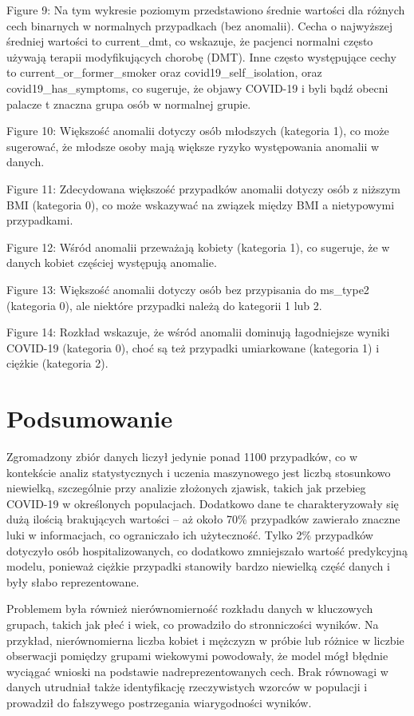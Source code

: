 \documentclass[a4paper,fleqn]{cas-dc}
\begin{document}
Figure 9: Na tym wykresie poziomym przedstawiono średnie wartości dla różnych cech binarnych w normalnych przypadkach (bez anomalii). Cecha o najwyższej średniej wartości to current\_dmt, co wskazuje, że pacjenci normalni często używają terapii modyfikujących chorobę (DMT). Inne często występujące cechy to current\_or\_former\_smoker oraz covid19\_self\_isolation, oraz covid19\_has\_symptoms, co sugeruje, że objawy COVID-19 i byli bądź obecni palacze t znaczna grupa osób w normalnej grupie.

Figure 10: Większość anomalii dotyczy osób młodszych (kategoria 1), co może sugerować, że młodsze osoby mają większe ryzyko występowania anomalii w danych.

Figure 11: Zdecydowana większość przypadków anomalii dotyczy osób z niższym BMI (kategoria 0), co może wskazywać na związek między BMI a nietypowymi przypadkami.

Figure 12: Wśród anomalii przeważają kobiety (kategoria 1), co sugeruje, że w danych kobiet częściej występują anomalie.

Figure 13: Większość anomalii dotyczy osób bez przypisania do ms\_type2 (kategoria 0), ale niektóre przypadki należą do kategorii 1 lub 2.

Figure 14: Rozkład wskazuje, że wśród anomalii dominują łagodniejsze wyniki COVID-19 (kategoria 0), choć są też przypadki umiarkowane (kategoria 1) i ciężkie (kategoria 2).

\section{Podsumowanie}
Zgromadzony zbiór danych liczył jedynie ponad 1100 przypadków, co w kontekście analiz statystycznych i uczenia maszynowego jest liczbą stosunkowo niewielką, szczególnie przy analizie złożonych zjawisk, takich jak przebieg COVID-19 w określonych populacjach. Dodatkowo dane te charakteryzowały się dużą ilością brakujących wartości – aż około 70\% przypadków zawierało znaczne luki w informacjach, co ograniczało ich użyteczność. Tylko 2\% przypadków dotyczyło osób hospitalizowanych, co dodatkowo zmniejszało wartość predykcyjną modelu, ponieważ ciężkie przypadki stanowiły bardzo niewielką część danych i były słabo reprezentowane.

Problemem była również nierównomierność rozkładu danych w kluczowych grupach, takich jak płeć i wiek, co prowadziło do stronniczości wyników. Na przykład, nierównomierna liczba kobiet i mężczyzn w próbie lub różnice w liczbie obserwacji pomiędzy grupami wiekowymi powodowały, że model mógł błędnie wyciągać wnioski na podstawie nadreprezentowanych cech. Brak równowagi w danych utrudniał także identyfikację rzeczywistych wzorców w populacji i prowadził do fałszywego postrzegania wiarygodności wyników.
\end{document}
